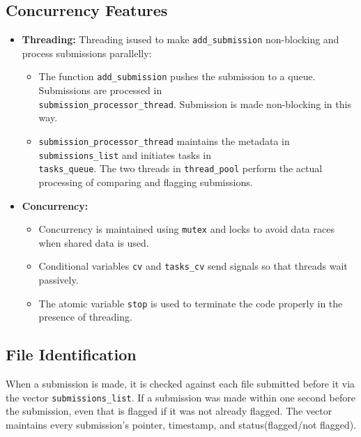 \documentclass[11pt]{article}
\let\oldtexttt\texttt
\def\texttt#1{{\color{RoyalBlue}\oldtexttt{#1}}}
\begin{document}
\subsection{Concurrency Features}
\begin{itemize}[noitemsep]
    \item \textbf{Threading:} Threading isused to make \texttt{add\_submission} non-blocking and process submissions parallelly:
    \begin{itemize}
        \item The function \texttt{add\_submission} pushes the submission to a queue. Submissions are processed in \\ \texttt{submission\_processor\_thread}. Submission is made non-blocking in this way.
        \item \texttt{submission\_processor\_thread} maintains the metadata in \texttt{submissions\_list} and initiates tasks in \\ \texttt{tasks\_queue}. The two threads in \texttt{thread\_pool} perform the actual processing of comparing and flagging submissions.
    \end{itemize}
    \item \textbf{Concurrency:} 
    \begin{itemize}
        \item Concurrency is maintained using \texttt{mutex} and locks to avoid data races when shared data is used.
        \item Conditional variables \texttt{cv} and \texttt{tasks\_cv} send signals so that threads wait passively.
        \item  The atomic variable \texttt{stop} is used to terminate the code properly in the presence of threading.
    \end{itemize} 
\end{itemize}
\vspace{-5pt}
\subsection{File Identification}
When a submission is made, it is checked against each file submitted before it via the vector \texttt{submissions\_list}. If a submission was made within one second before the submission, even that is flagged if it was not already flagged. The vector maintains every submission's pointer, timestamp, and status(flagged/not flagged).
\vspace{-5pt}
\end{document}
